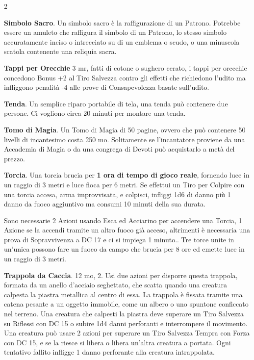 \begin{multicols}{2}

\textbf{Simbolo Sacro}\label{Simbolo Sacro}. Un simbolo sacro è la raffigurazione di un Patrono. Potrebbe essere un amuleto che raffigura il simbolo di un Patrono, lo stesso simbolo accuratamente inciso o intrecciato su di un emblema o scudo, o una minuscola scatola contenente una reliquia sacra.

\textbf{Tappi per Orecchie} 3 mr, fatti di cotone o sughero cerato, i tappi per orecchie concedono Bonus +2 al Tiro Salvezza contro gli effetti che richiedono l'udito ma infliggono penalità -4 alle prove di Consapevolezza basate sull'udito.

\textbf{Tenda}\label{Tenda}\hypertarget{Tenda}{}. Un semplice riparo portabile di tela, una tenda può contenere due persone. Ci vogliono circa 20 minuti per montare una tenda.

\textbf{Tomo di Magia}. Un Tomo di Magia di 50 pagine, ovvero che può contenere 50 livelli di incantesimo costa 250 mo. Solitamente se l'incantatore proviene da una Accademia di Magia o da una congrega di Devoti può acquistarlo a metà del prezzo.

\textbf{Torcia}\label{Torcia}\hypertarget{Torcia}{}. Una torcia brucia per \textbf{1 ora di tempo di gioco reale}, fornendo luce in un raggio di 3 metri e luce fioca per 6 metri. Se effettui un Tiro per Colpire con una torcia accesa, arma improvvisata, e colpisci, infliggi 1d6 di danno più 1 danno da fuoco aggiuntivo ma consumi 10 minuti della sua durata.

Sono necessarie 2 Azioni usando Esca ed Acciarino per accendere una Torcia, 1 Azione se la accendi tramite un altro fuoco già acceso, altrimenti è necessaria una prova di Sopravvivenza a DC 17 e ci si impiega 1 minuto.. Tre torce unite in un'unica possono fare un fuoco da campo che brucia per 8 ore ed emette luce in un raggio di 3 metri.

\textbf{Trappola da Caccia}\hypertarget{Trappola da Caccia}{}\label{Trappola da Caccia}. 12 mo, 2. Usi due azioni per disporre questa trappola, formata da un anello d'acciaio seghettato, che scatta quando una creatura calpesta la piastra metallica al centro di essa. La trappola è fissata tramite una catena pesante a un oggetto immobile, come un albero o uno spuntone conficcato nel terreno. Una creatura che calpesti la piastra deve superare un Tiro Salvezza su Riflessi con DC 15 o subire 1d4 danni perforanti e interrompere il movimento. Una creatura può usare 2 azioni per superare un Tiro Salvezza Tempra con Forza con DC 15, e se la riesce si libera o libera un'altra creatura a portata. Ogni tentativo fallito infligge 1 danno perforante alla creatura intrappolata.


\end{multicols}
